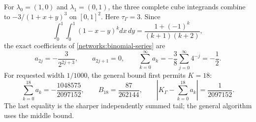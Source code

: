 For $\lambda_0=(1,0)$ and $\lambda_1=(0,1)$, the three complete cube
integrands combine to $-3/(1+x+y)^3$ on $[0,1]^2$.
Here $\tau_\Gamma=3$.  Since
\begin{equation}
 \int_0^1\!\int_0^1(1-x-y)^kdx\,dy
          =\frac{1+(-1)^k}{(k+1)(k+2)},
\end{equation}
the exact coefficients of \eqref{networks:binomial-series} are
\begin{equation}
 a_{2j}=-\frac3{2^{2j+3}},\qquad a_{2j+1}=0,\qquad
 \sum_{k=0}^{\infty}a_k=-\frac38\sum_{j=0}^{\infty}4^{-j}
                      =-\frac12.
 \label{networks:triangle-series}
\end{equation}
For requested width $1/1000$, the general bound first permits $K=18$:
\begin{equation}
 \sum_{k=0}^{18}a_k=-\frac{1048575}{2097152},\qquad
 B_{18}=\frac{87}{262144},\qquad
 \left|K_\Gamma-\sum_{k=0}^{18}a_k\right|=\frac1{2097152}.
 \label{networks:triangle-tail-control}
\end{equation}
The last equality is the sharper independently summed tail; the general
algorithm uses the middle bound.

